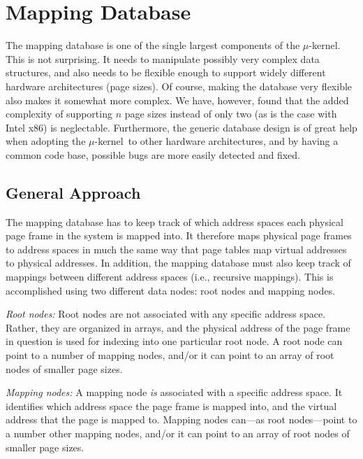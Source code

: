 \documentclass[a4paper,twoside]{book}
\newcommand{\ukern}{$\mu$-kernel}
\begin{document}
\section{Mapping Database}
\label{sec:mapping-db}

The mapping database is one of the single largest components of the
\ukern.  This is not surprising.  It needs to manipulate possibly very
complex data structures, and also needs to be flexible enough to
support widely different hardware architectures (page sizes).  Of
course, making the database very flexible also makes it somewhat more
complex.  We have, however, found that the added complexity of
supporting $n$ page sizes instead of only two (as is the case with
Intel x86) is neglectable.  Furthermore, the generic database design
is of great help when adopting the \ukern\ to other hardware
architectures, and by having a common code base, possible bugs are
more easily detected and fixed.


\subsection{General Approach}

The mapping database has to keep track of which address spaces each
physical page frame in the system is mapped into.  It therefore maps
physical page frames to address spaces in much the same way that page
tables map virtual addresses to physical addresses.  In addition, the
mapping database must also keep track of mappings between different
address spaces (i.e., recursive mappings).  This is accomplished using
two different data nodes: root nodes and mapping nodes.

\begin{description}
\item{\em Root nodes:} Root nodes are not associated with any specific
  address space.  Rather, they are organized in arrays, and the
  physical address of the page frame in question is used for indexing
  into one particular root node.  A root node can point to a number of
  mapping nodes, and/or it can point to an array of root nodes of
  smaller page sizes.
\item{\em Mapping nodes:} A mapping node \emph{is} associated with a
  specific address space.  It identifies which address space the page
  frame is mapped into, and the virtual address that the page is
  mapped to.  Mapping nodes can---as root nodes---point to a number
  other mapping nodes, and/or it can point to an array of root nodes
  of smaller page sizes.
\end{description}
\end{document}
